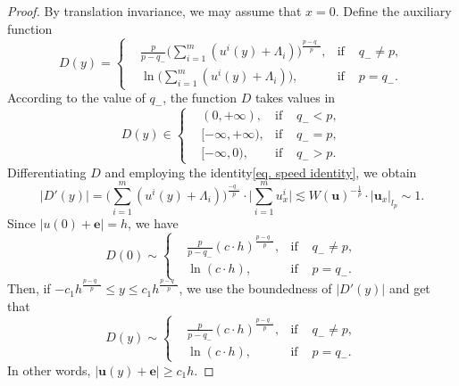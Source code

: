 \documentclass[11pt,twoside,reqno]{amsart}
\newcounter{assu}
\numberwithin{equation}{section}
\begin{document}
\begin{proof}
 By translation invariance, we may assume that $x=0$. Define the auxiliary function
    \begin{equation*}
        D(y)=\left\{\begin{aligned}
            &\frac{p}{p-q_{-}}\Big(\sum_{i=1}^{m}(u^{i}(y)+\Lambda_{i})\Big)^{\frac{p-q_{-}}{p}},&\mbox{if }&q_{-}\neq p,\\
            &\ln{\Big(\sum_{i=1}^{m}(u^{i}(y)+\Lambda_{i})\Big)},&\mbox{if }&p=q_{-}.
        \end{aligned}\right.
    \end{equation*}
   According to the value of $q_{-}$, the function $D$ takes values in
    \begin{equation*}
        D(y)\in\left\{\begin{aligned}
            &(0,+\infty),&\mbox{if }&q_{-}<p,\\
            &[-\infty,+\infty),&\mbox{if }&q_{-}=p,\\
            &[-\infty,0),&\mbox{if }&q_{-}>p.
        \end{aligned}\right.
    \end{equation*}
   Differentiating $D$  and employing the identity\eqref{eq. speed identity}, we obtain
    \begin{equation*}
        |D'(y)|=\Big(\sum_{i=1}^{m}(u^{i}(y)+\Lambda_{i})\Big)^{\frac{-q_{-}}{p}}\cdot\Big|\sum_{i=1}^{m}u^{i}_{x}\Big|\lesssim W(\mathbf{u})^{-\frac{1}{p}}\cdot|\mathbf{u}_{x}|_{l_{p}}\sim1.
    \end{equation*}
    Since $|u(0)+\mathbf{e}|=h$, we have
    \begin{equation*}
        D(0)\sim\left\{\begin{aligned}
            &\frac{p}{p-q_{-}}(c\cdot h)^{\frac{p-q_{-}}{p}},&\mbox{if }&q_{-}\neq p,\\
            &\ln{(c\cdot h)},&\mbox{if }&p=q_{-}.
        \end{aligned}\right.
    \end{equation*}
    Then, if $-c_{1}h^{\frac{p-q_{-}}{p}}\leq y\leq c_{1}h^{\frac{p-q_{-}}{p}}$, we use the boundedness of $|D'(y)|$ and get that
    \begin{equation*}
        D(y)\sim\left\{\begin{aligned}
            &\frac{p}{p-q_{-}}(c\cdot h)^{\frac{p-q_{-}}{p}},&\mbox{if }&q_{-}\neq p,\\
            &\ln{(c\cdot h)},&\mbox{if }&p=q_{-}.
        \end{aligned}\right.
    \end{equation*}
    In other words, $|\mathbf{u}(y)+\mathbf{e}|\geq c_{1}h$.
\end{proof}
\end{document}
